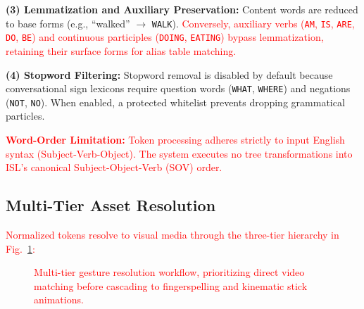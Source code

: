 \documentclass[conference,a4paper,10pt]{IEEEtran}
\begin{document}
\textbf{(3) Lemmatization and Auxiliary Preservation:} Content words are reduced to base forms (e.g., ``walked'' $\rightarrow$ \texttt{WALK}). \textcolor{red}{Conversely, auxiliary verbs (\texttt{AM}, \texttt{IS}, \texttt{ARE}, \texttt{DO}, \texttt{BE}) and continuous participles (\texttt{DOING}, \texttt{EATING}) bypass lemmatization, retaining their surface forms for alias table matching.}

\textbf{(4) Stopword Filtering:} Stopword removal is disabled by default because conversational sign lexicons require question words (\texttt{WHAT}, \texttt{WHERE}) and negations (\texttt{NOT}, \texttt{NO}). When enabled, a protected whitelist prevents dropping grammatical particles.

\textcolor{red}{\textbf{Word-Order Limitation:} Token processing adheres strictly to input English syntax (Subject-Verb-Object). The system executes no tree transformations into ISL's canonical Subject-Object-Verb (SOV) order.}

\subsection{Multi-Tier Asset Resolution}

\textcolor{red}{Normalized tokens resolve to visual media through the three-tier hierarchy in Fig.~\ref{fig:resolution}:}

\begin{figure}[t]
\centering
{}
\caption{\textcolor{red}{Multi-tier gesture resolution workflow, prioritizing direct video matching before cascading to fingerspelling and kinematic stick animations.}}
\label{fig:resolution}
\end{figure}
\end{document}
